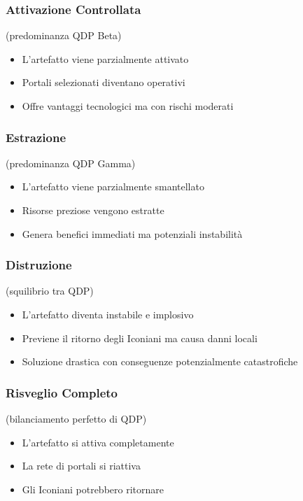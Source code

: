 \documentclass[letterpaper,twocolumn,openany,nodeprecatedcode]{dndbook}
\begin{document}
\subsubsection{Attivazione Controllata} (predominanza QDP Beta)
   \begin{itemize}
       \item L'artefatto viene parzialmente attivato
       \item Portali selezionati diventano operativi
       \item Offre vantaggi tecnologici ma con rischi moderati
   \end{itemize}

\subsubsection{Estrazione} (predominanza QDP Gamma)
   \begin{itemize}
       \item L'artefatto viene parzialmente smantellato
       \item Risorse preziose vengono estratte
       \item Genera benefici immediati ma potenziali instabilità
   \end{itemize}

\subsubsection{Distruzione} (squilibrio tra QDP)
   \begin{itemize}
       \item L'artefatto diventa instabile e implosivo
       \item Previene il ritorno degli Iconiani ma causa danni locali
       \item Soluzione drastica con conseguenze potenzialmente catastrofiche
   \end{itemize}

\subsubsection{Risveglio Completo} (bilanciamento perfetto di QDP)
   \begin{itemize}
       \item L'artefatto si attiva completamente
       \item La rete di portali si riattiva
       \item Gli Iconiani potrebbero ritornare
   \end{itemize}
\end{document}
